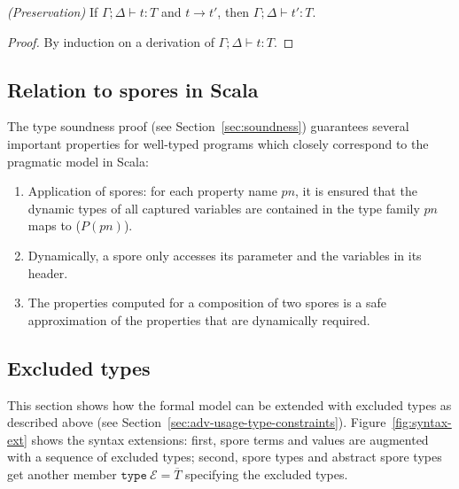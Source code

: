 \documentclass[runningheads]{llncs}
\newcommand{\seq}[1]{\overline{#1}}
\begin{document}
\begin{sloppypar}
\begin{theorem}
\emph{(Preservation)}
\label{th:pres}
If $\Gamma ; \Delta \vdash t : T$ and $t \rightarrow t'$, then $\Gamma ; \Delta \vdash t' : T$.
\vspace{-2.5mm}
\end{theorem}
\begin{proof}
By induction on a derivation of $\Gamma ; \Delta \vdash t : T$.
\end{proof}


\subsection{Relation to spores in Scala}

The type soundness proof (see Section~\ref{sec:soundness}) guarantees several important properties for well-typed programs which closely correspond to the pragmatic model in Scala:

\begin{enumerate}

\item Application of spores: for each property name $pn$, it is ensured that the dynamic types of all captured variables are contained in the type family $pn$ maps to ($P(pn)$).

\item Dynamically, a spore only accesses its parameter and the variables in its header.

\item The properties computed for a composition of two spores is a safe approximation of the properties that are dynamically required.

\end{enumerate}


\subsection{Excluded types}

This section shows how the formal model can be extended with excluded types as described above (see Section~\ref{sec:adv-usage-type-constraints}). Figure~\ref{fig:syntax-ext} shows the syntax extensions: first, spore terms and values are augmented with a sequence of excluded types; second, spore types and abstract spore types get another member $\texttt{type}~\mathcal{E} = \seq{T}$ specifying the excluded types.

\vspace{2mm}
\begin{figure}[ht!]
  \centering


\end{figure}
\end{sloppypar}
\end{document}
